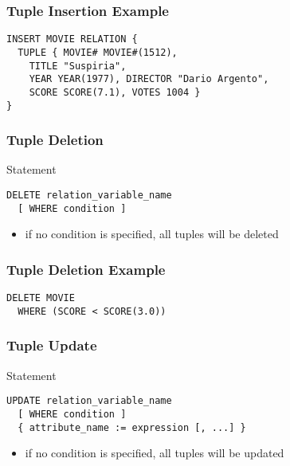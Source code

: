 \documentclass[dvipsnames]{beamer}
\theoremstyle{plain}
\begin{document}
\begin{frame}[fragile]
  \frametitle{Tuple Insertion Example}

  \begin{example}
    \begin{lstlisting}
INSERT MOVIE RELATION {
  TUPLE { MOVIE# MOVIE#(1512),
    TITLE "Suspiria",
    YEAR YEAR(1977), DIRECTOR "Dario Argento",
    SCORE SCORE(7.1), VOTES 1004 }
}
    \end{lstlisting}
  \end{example}
\end{frame}

\begin{frame}[fragile]
  \frametitle{Tuple Deletion}

  \begin{block}{Statement}
    \begin{lstlisting}
DELETE relation_variable_name
  [ WHERE condition ]
    \end{lstlisting}
  \end{block}

  \pause
  \begin{itemize}
    \item if no condition is specified, all tuples will be deleted
  \end{itemize}
\end{frame}

\begin{frame}[fragile]
  \frametitle{Tuple Deletion Example}

  \begin{example}
    \begin{lstlisting}
DELETE MOVIE
  WHERE (SCORE < SCORE(3.0))
    \end{lstlisting}
  \end{example}
\end{frame}

\begin{frame}[fragile]
  \frametitle{Tuple Update}

  \begin{block}{Statement}
    \begin{lstlisting}
UPDATE relation_variable_name
  [ WHERE condition ]
  { attribute_name := expression [, ...] }
    \end{lstlisting}
  \end{block}

  \pause
  \begin{itemize}
    \item if no condition is specified, all tuples will be updated
  \end{itemize}
\end{frame}
\end{document}
